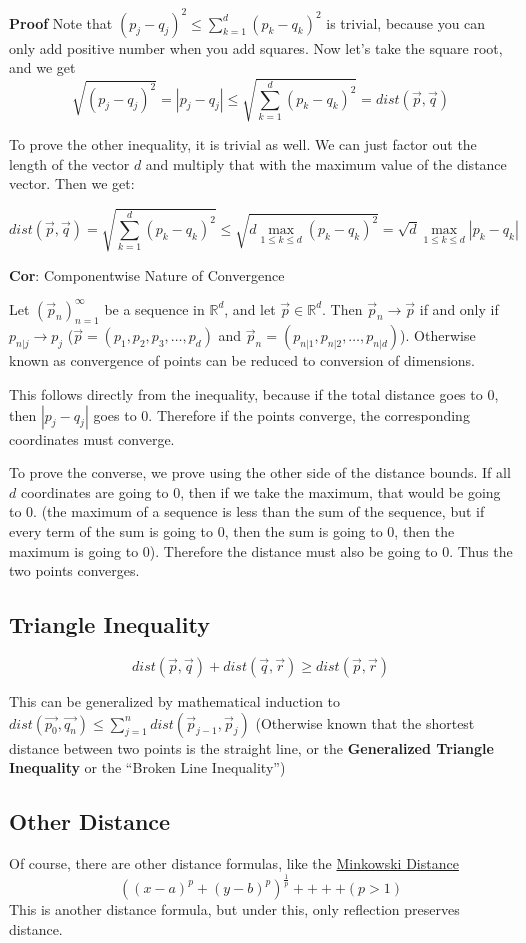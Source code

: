 \textbf{Proof}
Note that $(p_j - q_j)^2 \leq \sum_{k = 1}^d (p_k - q_k)^2$ is trivial, because
you can only add positive number when you add squares. Now let's take the square
root, and we get
$$\sqrt{(p_j - q_j)^2} = |p_j - q_j| \leq \sqrt{\sum_{k = 1}^d (p_k - q_k)^2} =
dist(\vec{p}, \vec{q})$$

To prove the other inequality, it is trivial as well. We can just factor out the
length of the vector $d$ and multiply that with the maximum value of the
distance vector. Then we get:

$$dist(\vec{p}, \vec{q}) = \sqrt{\sum_{k = 1}^d (p_k - q_k)^2} \leq \sqrt{d \max_{1 \leq k \leq d} (p_k -
q_k)^2} = \sqrt{d} \max_{1 \leq k \leq
d} |p_k - q_k|$$

\textbf{Cor}: Componentwise Nature of Convergence

Let $(\vec{p}_n)_{n = 1}^\infty$ be a sequence in $\mathbb{R}^d$, and let
$\vec{p} \in \mathbb{R}^d$. Then $\vec{p}_n \to \vec{p}$ if and only if
$p_{n|j} \to p_j$ ($\vec{p} = (p_1, p_2, p_3, \dots, p_d)$ and $\vec{p}_n =
(p_{n|1}, p_{n|2}, \dots, p_{n|d})$). Otherwise known as convergence of points
can be reduced to conversion of dimensions.

This follows directly from the inequality, because if the total distance goes to
0, then $|p_j - q_j|$ goes to 0. Therefore if the points converge, the
corresponding coordinates must converge.

To prove the converse, we prove using the other side of the distance bounds. If
all $d$ coordinates are going to 0, then if we take the maximum, that would be
going to 0. (the maximum of a sequence is less than the sum of the sequence, but
if every term of the sum is going to 0, then the sum is going to 0, then the
maximum is going to 0). Therefore the distance must also be going to 0. Thus the two points converges.

\subsection{Triangle Inequality}
$$dist(\vec{p}, \vec{q}) + dist(\vec{q}, \vec{r}) \geq dist(\vec{p}, \vec{r})$$

This can be generalized by mathematical induction to $dist(\vec{p_0}, \vec{q_n})
\leq \sum_{j = 1}^n dist(\vec{p}_{j - 1}, \vec{p}_{j})$ (Otherwise known that the
shortest distance between two points is the straight line, or the \textbf{Generalized
Triangle Inequality} or the ``Broken Line Inequality'')

\subsection{Other Distance}
Of course, there are other distance formulas, like the \underline{Minkowski Distance}
$$((x - a)^p + (y - b)^p)^{\frac{1}{p}} ++++ (p > 1)$$
This is another distance formula, but under this, only reflection preserves
distance.


